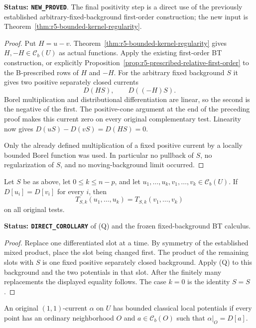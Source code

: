 \noindent\textbf{Status: \texttt{NEW\_PROVED}}. The final
positivity step is a direct use of the previously established
arbitrary-fixed-background first-order construction; the new
input is Theorem~\ref{thm:r5-bounded-kernel-regularity}.

\begin{proof}
Put $H=u-v$. Theorem~\ref{thm:r5-bounded-kernel-regularity}
gives $H,-H\in\mathcal C_b(U)$ as actual functions.
Apply the existing first-order BT construction, or explicitly
Proposition~\ref{prop:r5-prescribed-relative-first-order} to
the B-prescribed rows of $H$ and $-H$. For the arbitrary
fixed background $S$ it gives two positive separately
closed currents
\[
                         D(HS),\qquad D((-H)S).
\]
Borel multiplication and distributional differentiation are
linear, so the second is the negative of the first.
The positive-cone argument at the end of the preceding proof
makes this current zero on every original complementary test.
Linearity now gives $D(uS)-D(vS)=D(HS)=0$.

Only the already defined multiplication of a fixed positive
current by a locally bounded Borel function was used. In
particular no pullback of $S$, no regularization of $S$, and
no moving-background limit occurred.
\end{proof}

\begin{corollary}
\label{cor:r5-differentiated-slot-quotient}
Let $S$ be as above, let $0\leq k\leq n-p$, and let
$u_1,\ldots,u_k,v_1,\ldots,v_k\in\mathcal C_b(U)$.
If $D[u_i]=D[v_i]$ for every $i$, then
\[
              T_{S,k}(u_1,\ldots,u_k)
                    =T_{S,k}(v_1,\ldots,v_k)
\]
on all original tests.
\end{corollary}

\noindent\textbf{Status: \texttt{DIRECT\_COROLLARY}} of (Q)
and the frozen fixed-background BT calculus.

\begin{proof}
Replace one differentiated slot at a time. By symmetry of
the established mixed product, place the slot being changed
first. The product of the remaining slots with $S$ is one
fixed positive separately closed background. Apply (Q) to
this background and the two potentials in that slot.
After the finitely many replacements the displayed equality
follows. The case $k=0$ is the identity $S=S$.
\end{proof}

\begin{definition}
\label{def:r5-classical-potential-current}
An original $(1,1)$-current $\alpha$ on $U$ has bounded
classical local potentials if every point has an ordinary
neighborhood $O$ and $a\in\mathcal C_b(O)$ such that
$\alpha|_O=D[a]$.
\end{definition}


